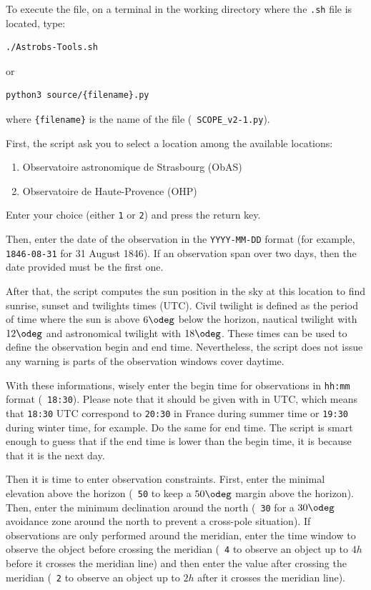 \documentclass[10pt, a4paper]{article} %
\begin{document}
To execute the file, on a terminal in the working directory where the \texttt{.sh} file is located, type:
\begin{lstlisting}[language=bash]
./Astrobs-Tools.sh
\end{lstlisting}
or
\begin{lstlisting}[language=bash]
python3 source/{filename}.py
\end{lstlisting}
where \texttt{\{filename\}} is the name of the file (\eg\ \texttt{SCOPE\_v2-1.py}).
\bigskip

First, the script ask you to select a location among the available locations:
\begin{enumerate}
     \item Observatoire astronomique de Strasbourg (ObAS)
     \item Observatoire de Haute-Provence (OHP)
\end{enumerate}
Enter your choice (either \texttt{1} or \texttt{2}) and press the return key.
\bigskip

Then, enter the date of the observation in the \texttt{YYYY-MM-DD} format (for example, \texttt{1846-08-31} for 31 August 1846). If an observation span over two days, then the date provided must be the first one.
\bigskip

After that, the script computes the sun position in the sky at this location to find sunrise, sunset and twilights times (UTC). Civil twilight is defined as the period of time where the sun is above $6\odeg$ below the horizon, nautical twilight with $12\odeg$ and astronomical twilight with $18\odeg$. These times can be used to define the observation begin and end time. Nevertheless, the script does not issue any warning is parts of the observation windows cover daytime.
\bigskip

With these informations, wisely enter the begin time for observations in \texttt{hh:mm} format (\eg\ \texttt{18:30}). Please note that it should be given with in UTC, which means that \texttt{18:30} UTC correspond to \texttt{20:30} in France during summer time or \texttt{19:30} during winter time, for example. Do the same for end time. The script is smart enough to guess that if the end time is lower than the begin time, it is because that it is the next day.
\bigskip

Then it is time to enter observation constraints. First, enter the minimal elevation above the horizon (\eg\ \texttt{50} to keep a $50\odeg$ margin above the horizon). Then, enter the minimum declination around the north (\eg\ \texttt{30} for a $30\odeg$ avoidance zone around the north to prevent a cross-pole situation). If observations are only performed around the meridian, enter the time window to observe the object before crossing the meridian (\eg\ \texttt{4} to observe an object up to $4\unit{h}$ before it crosses the meridian line) and then enter the value after crossing the meridian (\eg\ \texttt{2} to observe an object up to $2\unit{h}$ after it crosses the meridian line). 
\bigskip
\end{document}
